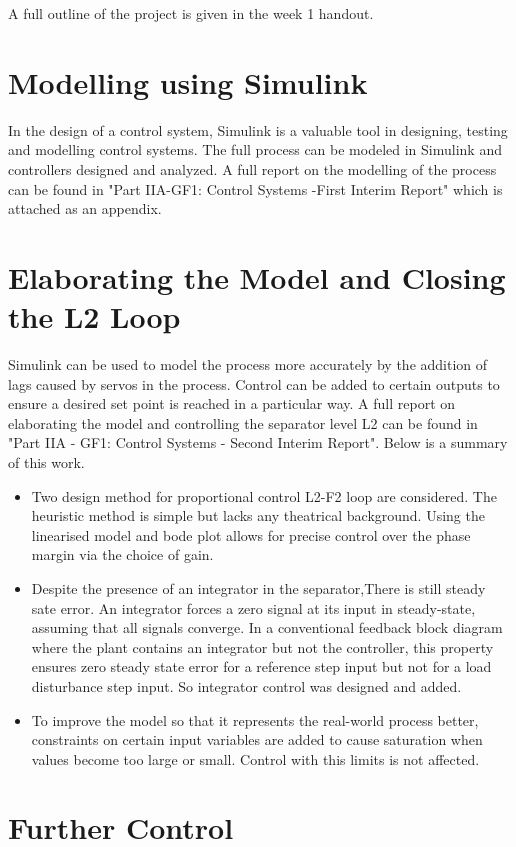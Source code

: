 \documentclass[11pt]{article}
\begin{document}
A full outline of the project is given in the week 1 handout.

\section{Modelling using Simulink}
In the design of a control system, Simulink is a valuable tool in designing, testing and modelling control systems. The full process can be modeled in Simulink and controllers designed and analyzed. A full report on the modelling of the process can be found in "Part IIA-GF1: Control Systems -First Interim Report" which is attached as an appendix. 

\section{Elaborating the Model and Closing the L2 Loop}
Simulink can be used to model the process more accurately by the addition of lags caused by servos in the process. Control can be added to certain outputs to ensure a desired set point is reached in a particular way. A full report on elaborating the model and controlling the separator level L2 can be found in "Part IIA - GF1: Control Systems - Second Interim Report". Below is a summary of this work.

\begin{itemize}
    \item Two design method for proportional control L2-F2 loop are considered. The heuristic method is simple but lacks any theatrical background. Using the linearised model and bode plot allows for precise control over the phase margin via the choice of gain.
    \item Despite the presence of an integrator in the separator,There is still steady sate error. An integrator forces a zero signal at its input in steady-state, assuming that all signals converge. In a conventional feedback block diagram where the plant contains an integrator but not the controller, this property ensures zero steady state error for a reference step input but not for a load disturbance step input. So integrator control was designed and added.
    \item To improve the model so that it represents the real-world process better, constraints on certain input variables are added to cause saturation when values become too large or small. Control with this limits is not affected.
\end{itemize}

\section{Further Control}
\end{document}
